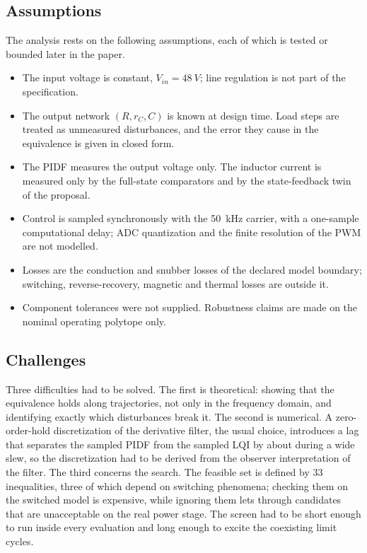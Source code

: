 \subsection{Assumptions}\label{sec:assump}
The analysis rests on the following assumptions, each of which is tested or
bounded later in the paper.
\begin{itemize}
\item The input voltage is constant, $V_{in}=\SI{48}{V}$; line regulation is not
  part of the specification.
\item The output network $(R,r_C,C)$ is known at design time. Load steps are
  treated as unmeasured disturbances, and the error they cause in the
  equivalence is given in closed form.
\item The PIDF measures the output voltage only. The inductor current is
  measured only by the full-state comparators and by the state-feedback twin of
  the proposal.
\item Control is sampled synchronously with the \SI{50}{kHz} carrier, with a
  one-sample computational delay; ADC quantization and the finite resolution of
  the PWM are not modelled.
\item Losses are the conduction and snubber losses of the declared model
  boundary; switching, reverse-recovery, magnetic and thermal losses are
  outside it.
\item Component tolerances were not supplied. Robustness claims are made on
  the nominal operating polytope only.
\end{itemize}

\subsection{Challenges}\label{sec:challenges}
Three difficulties had to be solved. The first is theoretical: showing that
the equivalence holds along trajectories, not only in the frequency domain,
and identifying exactly which disturbances break it. The second is numerical.
A zero-order-hold discretization of the derivative filter, the usual choice,
introduces a lag that separates the sampled PIDF from the sampled LQI by about
\EqSampZOH{} during a wide slew, so the discretization had to be derived from
the observer interpretation of the filter. The third concerns the search. The
feasible set is defined by 33 inequalities, three of which depend on switching
phenomena; checking them on the switched model is expensive, while ignoring
them lets through candidates that are unacceptable on the real power stage.
The screen had to be short enough to run inside every evaluation and long
enough to excite the coexisting limit cycles.


